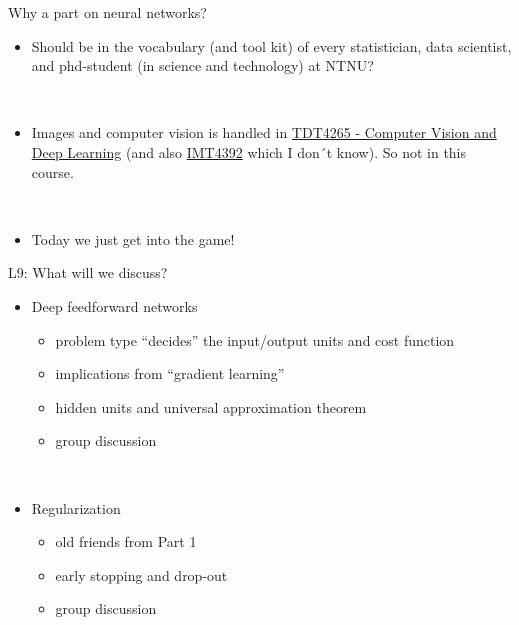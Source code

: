 \documentclass[
  ignorenonframetext,
]{beamer}
\providecommand{\tightlist}{%
  \setlength{\itemsep}{0pt}\setlength{\parskip}{0pt}}
\begin{document}
\begin{frame}
\begin{block}{Why a part on neural networks?}
\protect\hypertarget{why-a-part-on-neural-networks}{}
\begin{itemize}
\tightlist
\item
  Should be in the vocabulary (and tool kit) of every statistician, data
  scientist, and phd-student (in science and technology) at NTNU?
\end{itemize}

\(~\)

\begin{itemize}
\tightlist
\item
  Images and computer vision is handled in
  \href{https://www.ntnu.edu/studies/courses/TDT4265\#tab=omEmnet}{TDT4265
  - Computer Vision and Deep Learning} (and also
  \href{https://www.ntnu.no/studier/emner/IMT4392\#tab=omEmnet}{IMT4392}
  which I don´t know). So not in this course.
\end{itemize}

\(~\)

\begin{itemize}
\tightlist
\item
  Today we just get into the game!
\end{itemize}
\end{block}
\end{frame}

\begin{frame}
\begin{block}{L9: What will we discuss?}
\protect\hypertarget{l9-what-will-we-discuss}{}
\(~\)

\begin{itemize}
\tightlist
\item
  Deep feedforward networks

  \begin{itemize}
  \tightlist
  \item
    problem type ``decides'' the input/output units and cost function
  \item
    implications from ``gradient learning''
  \item
    hidden units and universal approximation theorem
  \item
    group discussion
  \end{itemize}
\end{itemize}

\(~\)

\begin{itemize}
\tightlist
\item
  Regularization

  \begin{itemize}
  \tightlist
  \item
    old friends from Part 1
  \item
    early stopping and drop-out
  \item
    group discussion
  \end{itemize}
\end{itemize}
\end{block}
\end{frame}
\end{document}
